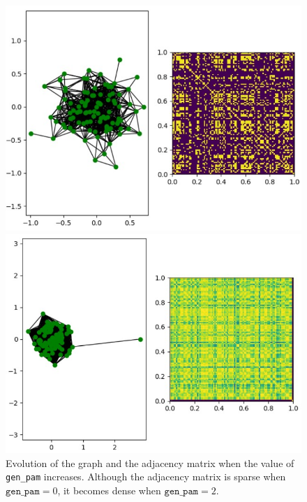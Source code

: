 \documentclass[a4paper, 11pt]{article}
\begin{document}
    \begin{figure}[!ht]
     \begin{minipage}{0.48\textwidth}
     \begin{center}
         \includegraphics[width=\textwidth]{images/gen_pam_0.jpg}
         \caption{$\texttt{gen\_pam} = 0$}
     \end{center}
     \end{minipage}
     \hfill
     \begin{minipage}{0.48\textwidth}
     \begin{center}
         \includegraphics[width=\textwidth]{images/gen_pam_2.jpg}
         \caption{$\texttt{gen\_pam} = 2$}
     \end{center}
     \end{minipage}
        \caption{Evolution of the graph and the adjacency matrix when the value of \texttt{gen\_pam} increases. Although the adjacency matrix is sparse when $\texttt{gen\_pam} = 0$, it becomes dense when $\texttt{gen\_pam} = 2$.}
        \label{fig:gen-pam-influence}
    \end{figure}
    
\end{document}
